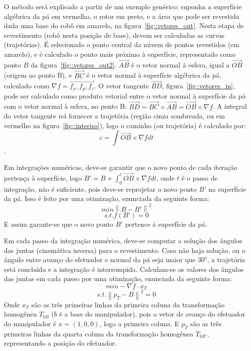 O método será explicado a partir de um exemplo genérico: suponha a superfície
algébrica da pá em vermelho, o rotor em preto, e a área que pode ser
revestida dada uma base do robô em amarelo, na figura~\ref{fig::vetores_out}.
Nesta etapa de revestimento (robô nesta posição de base), devem ser calculadas
as curvas (trajetórias). É selecionado o ponto central da núvem de
pontos revestidos (em amarelo), e é calculado o ponto mais próximo à superfície,
representado como ponto $B$ da figura~\ref{fig::vetores_out2}.
$\vec{AB}$ é o vetor normal à esfera, igual a $\vec{OB}$ (origem ao ponto B), e $\vec{BC}$ é o vetor normal à superfície
algébrica da pá, calculado como $\nabla{f} = \vec{f_x,f_y,f_z}$. O vetor
tangente $\vec{BD}$, figura~\ref{fig::vetores_in}, pode ser calculado como
produto vetorial entre o vetor normal à superfície da pá com o vetor normal à
esfera, no ponto B: $\vec{BD} = \vec{BC} \times \vec{AB} = \vec{OB} \times
\nabla{f}$. A integral do vetor tangente irá fornecer a trajetória (região
cinza sombreada, ou em vermelho na figura~\ref{fig::interiso}), logo o caminho
(ou trajetória) é calculado por:
$$c = \int \vec{OB} \times \nabla{f} dt$$. 

Em integrações numéricas, deve-se garantir que o novo ponto de cada iteração
pertença à superfície, logo $B' = B + \int_0^t \vec{OB} \times \nabla{f} dt$, onde $t$ é o passo de integração, não é
suficiente, pois deve-se reprojetar o novo ponto $B'$ na superfície da pá. Isso
é feito por uma otimização, enunciada da seguinte forma:
$$min \left \| B-B' \right \|^2$$
$$s.t. f(B')=0$$
E assim garante-se que o novo ponto $B'$ pertence à superfície da pá.

Em cada passo da integração numérica, deve-se computar a solução dos ângulos das
juntas (cinemática inversa) para o revestimento. Caso não haja solução, ou o
ângulo entre avanço do efetuador e normal da pá seja maior que $30^o$, a trajetória está
concluída e a integração é interrompida. Calculam-se os valores dos ângulos das
juntas em cada passo por uma otimização, enunciada da seguinte forma:
$$min -\nabla{f}\cdot x_T$$
$$s.t. \left \| p_T-B \right \|^2=0$$
Onde $x_T$ são as três primeiras linhas da primeira coluna da transformação
homogênea $T_{bB}$ ($b$ é a base do manipulador), pois o vetor de avanço do
efetuador do manipulador é $x=(1,0,0)$, logo a primeira coluna. E $p_T$ são as
três primeiras linhas da quarta coluna da transformação
homogênea $T_{bB'}$, representando a posição do efetuador.

